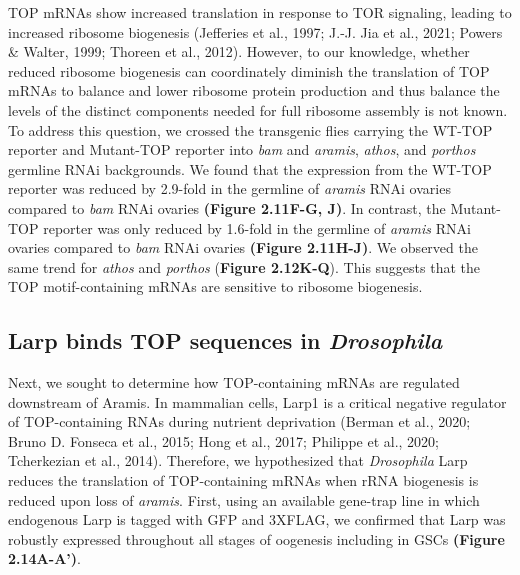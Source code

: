 \documentclass[12pt,oneside]{reedthesis}
\begin{document}
TOP mRNAs show increased translation in response to TOR signaling,
leading to increased ribosome biogenesis
(Jefferies et al., 1997; J.-J. Jia et al., 2021; Powers \& Walter, 1999; Thoreen et al., 2012). However, to our knowledge,
whether reduced ribosome biogenesis can coordinately diminish the
translation of TOP mRNAs to balance and lower ribosome protein
production and thus balance the levels of the distinct components needed
for full ribosome assembly is not known. To address this question, we
crossed the transgenic flies carrying the WT-TOP reporter and Mutant-TOP
reporter into \emph{bam} and \emph{aramis}, \emph{athos}, and \emph{porthos} germline RNAi
backgrounds. We found that the expression from the WT-TOP reporter was
reduced by 2.9-fold in the germline of \emph{aramis} RNAi ovaries compared to
\emph{bam} RNAi ovaries \textbf{(Figure 2.11F-G, J)}. In contrast, the Mutant-TOP
reporter was only reduced by 1.6-fold in the germline of \emph{aramis} RNAi
ovaries compared to \emph{bam} RNAi ovaries \textbf{(Figure 2.11H-J)}. We observed
the same trend for \emph{athos} and \emph{porthos} (\textbf{Figure 2.12K-Q}). This
suggests that the TOP motif-containing mRNAs are sensitive to ribosome
biogenesis.

\hypertarget{larp-binds-top-sequences-in-drosophila}{%
\subsection{\texorpdfstring{Larp binds TOP sequences in \emph{Drosophila}}{Larp binds TOP sequences in Drosophila}}\label{larp-binds-top-sequences-in-drosophila}}

Next, we sought to determine how TOP-containing mRNAs are regulated
downstream of Aramis. In mammalian cells, Larp1 is a critical negative
regulator of TOP-containing RNAs during nutrient deprivation
(Berman et al., 2020; Bruno D. Fonseca et al., 2015; Hong et al., 2017; Philippe et al., 2020; Tcherkezian et al., 2014). Therefore, we
hypothesized that \emph{Drosophila} Larp reduces the translation of
TOP-containing mRNAs when rRNA biogenesis is reduced upon loss of
\emph{aramis}. First, using an available gene-trap line in which endogenous
Larp is tagged with GFP and 3XFLAG, we confirmed that Larp was robustly
expressed throughout all stages of oogenesis including in GSCs \textbf{(Figure 2.14A-A')}.
\end{document}

